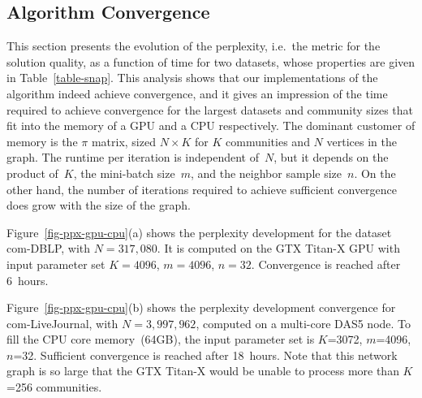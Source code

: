 
\begin{comment}
\begin{figure}[t]	%
  \centering
  \epsfig{file=plots/ppx-gpu.eps, width=\columnwidth}
  \caption{Perplexity convergence of com-DBLP on the GTX~Titan-X~GPU. Number
  of communities chosen to maximally fill the GPU memory.}
  \label{fig-ppx-gpu}
\end{figure}

\begin{figure}[t]	%
  \centering
  \epsfig{file=plots/ppx-cpu.eps, width=\columnwidth}
  \caption{Perplexity convergence of com-LiveJournal on the multi-core~CPU.
  Number of communities chosen to maximally fill the CPU memory.}
  \label{fig-ppx-cpu}
\end{figure}
\end{comment}

\begin{figure*}[t]	%
  \centering
  \caption{Perplexity convergence. (a)~com-DBLP on the GTX~Titan-X~CPU.
  (b)~com-LiveJournal on the multi-core~CPU. Number of communities chosen to
  maximally fill the memory of GPU and CPU respectively.}
  \label{fig-ppx-gpu-cpu}
\end{figure*}

\subsection{Algorithm Convergence}

This section presents the evolution of the perplexity, i.e.\ the metric for
the solution quality, as a function of time for
two datasets, whose properties are given in Table~\ref{table-snap}. This
analysis shows that our implementations of the algorithm indeed achieve
convergence, and it gives an impression of the time required to achieve
convergence for the largest datasets and community sizes that fit into the memory
of a GPU and a CPU respectively. The dominant customer of memory is the
$\pi$ matrix, sized $N{\times}K$ for $K$ communities and $N$ vertices in the
graph. The runtime per iteration is independent of~$N$, but it depends on the
product of~$K$, the mini-batch size~$m$, and the neighbor sample size~$n$. On
the other hand, the number of iterations required to achieve sufficient
convergence does grow with the size of the graph.

Figure~\ref{fig-ppx-gpu-cpu}(a) shows the perplexity development for the dataset
com-DBLP, with $N=317,080$. It is computed on the GTX Titan-X GPU with input
parameter set $K=4096$, $m=4096$, $n=32$. Convergence is reached after 6~hours.

Figure~\ref{fig-ppx-gpu-cpu}(b) shows the perplexity development convergence for
com-LiveJournal, with $N=3,997,962$, computed on a multi-core DAS5 node.
To fill the CPU core memory~(64GB), the input parameter set is $K$=3072,
$m$=4096, $n$=32. Sufficient convergence is reached after 18~hours. Note
that this network graph is so large that the GTX Titan-X would be unable to
process more than $K$=256 communities.
